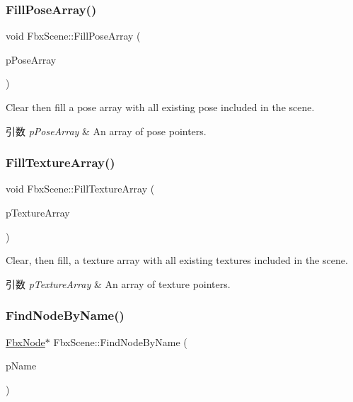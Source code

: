 \subsubsection{\texorpdfstring{Fill\+Pose\+Array()}{FillPoseArray()}}
{\footnotesize\ttfamily void Fbx\+Scene\+::\+Fill\+Pose\+Array (\begin{DoxyParamCaption}\item[{\hyperlink{class_fbx_array}{Fbx\+Array}$<$ \hyperlink{class_fbx_pose}{Fbx\+Pose} $\ast$$>$ \&}]{p\+Pose\+Array }\end{DoxyParamCaption})}

Clear then fill a pose array with all existing pose included in the scene. 
\begin{DoxyParams}{引数}
{\em p\+Pose\+Array} & An array of pose pointers. \\
\hline
\end{DoxyParams}
\mbox{\label{class_fbx_scene_aa1c0e661ae74b086bbdc546e1fdcff66}} 
\subsubsection{\texorpdfstring{Fill\+Texture\+Array()}{FillTextureArray()}}
{\footnotesize\ttfamily void Fbx\+Scene\+::\+Fill\+Texture\+Array (\begin{DoxyParamCaption}\item[{\hyperlink{class_fbx_array}{Fbx\+Array}$<$ \hyperlink{class_fbx_texture}{Fbx\+Texture} $\ast$$>$ \&}]{p\+Texture\+Array }\end{DoxyParamCaption})}

Clear, then fill, a texture array with all existing textures included in the scene. 
\begin{DoxyParams}{引数}
{\em p\+Texture\+Array} & An array of texture pointers. \\
\hline
\end{DoxyParams}
\mbox{\label{class_fbx_scene_ad0efe7531b777c959c690f57a3052706}} 
\subsubsection{\texorpdfstring{Find\+Node\+By\+Name()}{FindNodeByName()}}
{\footnotesize\ttfamily \hyperlink{class_fbx_node}{Fbx\+Node}$\ast$ Fbx\+Scene\+::\+Find\+Node\+By\+Name (\begin{DoxyParamCaption}\item[{const \hyperlink{class_fbx_string}{Fbx\+String} \&}]{p\+Name }\end{DoxyParamCaption})}

